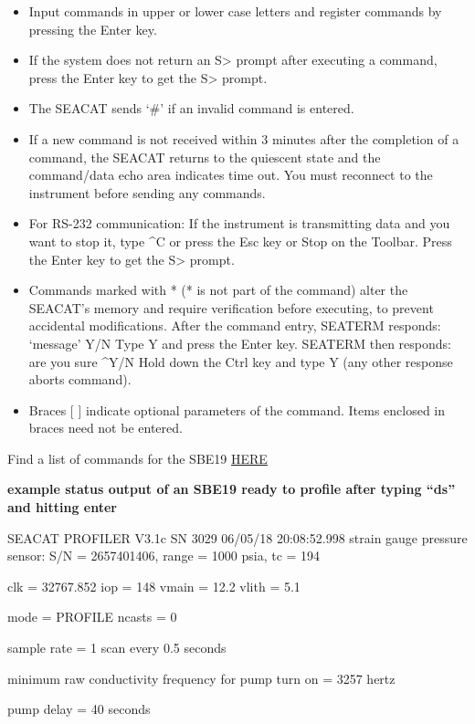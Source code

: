 \documentclass[
]{book}
\providecommand{\tightlist}{%
  \setlength{\itemsep}{0pt}\setlength{\parskip}{0pt}}
\begin{document}
\begin{itemize}
\tightlist
\item
  Input commands in upper or lower case letters and register commands by pressing the Enter key.
\item
  If the system does not return an S\textgreater{} prompt after executing a command, press the Enter key to get the S\textgreater{} prompt.
\item
  The SEACAT sends `\#' if an invalid command is entered.
\item
  If a new command is not received within 3 minutes after the completion of a command, the SEACAT returns to the quiescent state and the command/data echo area indicates time out. You must reconnect to the instrument before sending any commands.
\item
  For RS-232 communication: If the instrument is transmitting data and you want to stop it, type \^{}C or press the Esc key or Stop on the Toolbar. Press the Enter key to get the S\textgreater{} prompt.
\item
  Commands marked with * (* is not part of the command) alter the SEACAT's memory and require verification before executing, to prevent accidental modifications.
  After the command entry, SEATERM responds:
  `message' Y/N Type Y and press the Enter key.
  SEATERM then responds:
  are you sure \^{}Y/N Hold down the Ctrl key and type Y (any other response aborts command).
\item
  Braces {[} {]} indicate optional parameters of the command. Items enclosed in braces need not be entered.
\end{itemize}

Find a list of commands for the SBE19 \href{https://docs.google.com/document/d/1WkYxlEDpUm_A1JY6Fx7Kq8Fi2c_drbbzcXDoJRtYLZk/edit}{HERE}

\textbf{example status output of an SBE19 ready to profile after typing ``ds'' and hitting enter}

SEACAT PROFILER V3.1c SN 3029 06/05/18 20:08:52.998
strain gauge pressure sensor: S/N = 2657401406, range = 1000 psia, tc = 194

clk = 32767.852 iop = 148 vmain = 12.2 vlith = 5.1

mode = PROFILE ncasts = 0

sample rate = 1 scan every 0.5 seconds

minimum raw conductivity frequency for pump turn on = 3257 hertz

pump delay = 40 seconds
\end{document}
